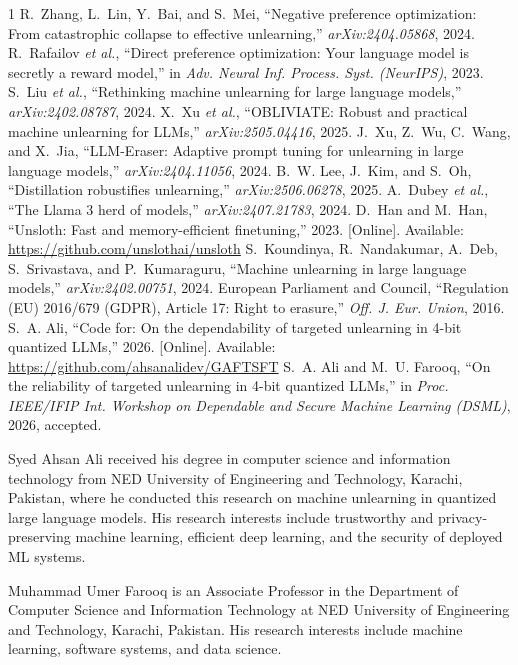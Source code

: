 \documentclass[journal]{IEEEtran}
\begin{document}
\begin{thebibliography}{1}
 R.~Zhang, L.~Lin, Y.~Bai, and S.~Mei, ``Negative preference optimization: From catastrophic collapse to effective unlearning,'' \emph{arXiv:2404.05868}, 2024.
 R.~Rafailov \emph{et al.}, ``Direct preference optimization: Your language model is secretly a reward model,'' in \emph{Adv. Neural Inf. Process. Syst. (NeurIPS)}, 2023.
 S.~Liu \emph{et al.}, ``Rethinking machine unlearning for large language models,'' \emph{arXiv:2402.08787}, 2024.
 X.~Xu \emph{et al.}, ``OBLIVIATE: Robust and practical machine unlearning for LLMs,'' \emph{arXiv:2505.04416}, 2025.
 J.~Xu, Z.~Wu, C.~Wang, and X.~Jia, ``LLM-Eraser: Adaptive prompt tuning for unlearning in large language models,'' \emph{arXiv:2404.11056}, 2024.
 B.~W. Lee, J.~Kim, and S.~Oh, ``Distillation robustifies unlearning,'' \emph{arXiv:2506.06278}, 2025.
 A.~Dubey \emph{et al.}, ``The Llama 3 herd of models,'' \emph{arXiv:2407.21783}, 2024.
 D.~Han and M.~Han, ``Unsloth: Fast and memory-efficient finetuning,'' 2023. [Online]. Available: \url{https://github.com/unslothai/unsloth}
 S.~Koundinya, R.~Nandakumar, A.~Deb, S.~Srivastava, and P.~Kumaraguru, ``Machine unlearning in large language models,'' \emph{arXiv:2402.00751}, 2024.
 European Parliament and Council, ``Regulation (EU) 2016/679 (GDPR), Article 17: Right to erasure,'' \emph{Off. J. Eur. Union}, 2016.
 S.~A. Ali, ``Code for: On the dependability of targeted unlearning in 4-bit quantized LLMs,'' 2026. [Online]. Available: \url{https://github.com/ahsanalidev/GAFTSFT}
 S.~A. Ali and M.~U. Farooq, ``On the reliability of targeted unlearning in 4-bit quantized LLMs,'' in \emph{Proc. IEEE/IFIP Int. Workshop on Dependable and Secure Machine Learning (DSML)}, 2026, accepted.
\end{thebibliography}

\begin{IEEEbiographynophoto}{Syed Ahsan Ali}
received his degree in computer science and information technology from NED University of Engineering and Technology, Karachi, Pakistan, where he conducted this research on machine unlearning in quantized large language models. His research interests include trustworthy and privacy-preserving machine learning, efficient deep learning, and the security of deployed ML systems.
\end{IEEEbiographynophoto}

\begin{IEEEbiographynophoto}{Muhammad Umer Farooq}
is an Associate Professor in the Department of Computer Science and Information Technology at NED University of Engineering and Technology, Karachi, Pakistan. His research interests include machine learning, software systems, and data science.
\end{IEEEbiographynophoto}
\end{document}
